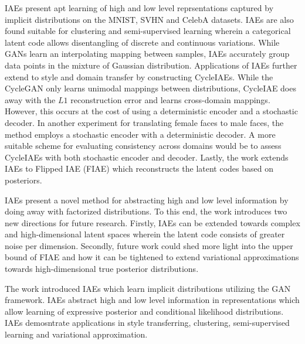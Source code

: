 \documentclass[11pt,letterpaper]{article}
\begin{document}
IAEs present apt learning of high and low level reprsentations captured by implicit distributions on the MNIST, SVHN and CelebA datasets. IAEs are also found suitable for clustering and semi-supervised learning wherein a categorical latent code allows disentangling of discrete and continuous variations. While GANs learn an interpolating mapping between samples, IAEs accurately group data points in the mixture of Gaussian distribution. Applications of IAEs further extend to style and domain transfer by constructing CycleIAEs. While the CycleGAN only learns unimodal mappings between distributions, CycleIAE does away with the $L1$ reconstruction error and learns cross-domain mappings. However, this occurs at the cost of using a deterministic encoder and a stochastic decoder. In another experiment for translating female faces to male faces, the method employs a stochastic encoder with a deterministic decoder. A more suitable scheme for evaluating consistency across domains would be to assess CycleIAEs with both stochastic encoder and decoder. Lastly, the work extends IAEs to Flipped IAE (FIAE) which reconstructs the latent codes based on posteriors.

IAEs present a novel method for abstracting high and low level information by doing away with factorized distributions. To this end, the work introduces two new directions for future research. Firstly, IAEs can be extended towards complex and high-dimensional latent spaces wherein the latent code consists of greater noise per dimension. Secondly, future work could shed more light into the upper bound of FIAE and how it can be tightened to extend variational approximations towards high-dimensional true posterior distributions. 

The work introduced IAEs which learn implicit distributions utilizing the GAN framework. IAEs abstract high and low level information in representations which allow learning of expressive posterior and conditional likelihood distributions. IAEs demosntrate applications in style transferring, clustering, semi-supervised learning and variational approximation. 
\end{document}
